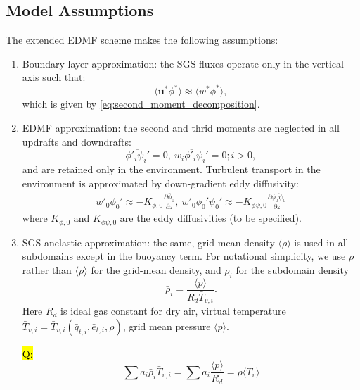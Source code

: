 \documentclass{report}
\begin{document}
\subsection{Model Assumptions} \label{sec:Model Assumptions}
The extended EDMF scheme makes the following assumptions:
\begin{enumerate}
\item Boundary layer approximation: the SGS fluxes operate only in the vertical axis such that:
\begin{equation}
\label{eq:bl_approximation} 
\langle \mathbf{u}^* \phi^* \rangle \approx \langle w^* \phi^* \rangle,
\end{equation}
which is given by \eqref{eq:second_moment_decomposition}.
\item EDMF approximation: the second and thrid moments are neglected in all updrafts and downdrafts:
\begin{equation}
\label{eq:vertical_eddy_diffusivty} 
\overline{\phi'_i \psi_i'} = 0,\ \overline{w_i \phi'_i \psi_i'} = 0; i>0,
\end{equation}
and are retained only in the environment. Turbulent transport in the environment is approximated by down-gradient eddy diffusivity:
\begin{eqnarray}
\label{eq:vertical_eddy_diffusivty} 
\overline{w'_0 \phi_0'} \approx - K_{\phi, 0} \frac{\partial \bar{\phi}_0}{\partial z},\ \overline{w'_0 \phi_0' \psi_0'} \approx - K_{\phi\psi, 0}\frac{\partial \overline{\phi_0\psi_0}}{\partial z}
\end{eqnarray}
where $K_{\phi,0}$ and $K_{\phi\psi,0}$ are the eddy diffusivities (to be specified).  

\item SGS-anelastic approximation: the same, grid-mean density $\langle\rho\rangle$ is used in all subdomains except in the buoyancy term.  For notational simplicity, we use $\rho$ rather than $\langle\rho\rangle$ for the grid-mean density, and $\bar{\rho}_i$ for the subdomain density
\begin{equation}
\bar{\rho}_i  = \frac{\langle p \rangle}{R_d\bar{T}_{v,i}}.
\label{eq:subdomain_eos} 
\end{equation}
Here $R_d$ is ideal gas constant for dry air, virtual temperature $\bar{T}_{v,i} = \bar{T}_{v,i}(\bar{q}_{t,i}, \bar{e}_{t,i}, \rho)$, grid mean pressure $\langle p \rangle$.

\hl{Q:}
$$\sum a_i \bar{\rho}_i \bar{T}_{v,i} = \sum a_i \frac{\langle p \rangle}{R_d} = \rho \langle {T}_v \rangle$$


\end{enumerate}
\end{document}
